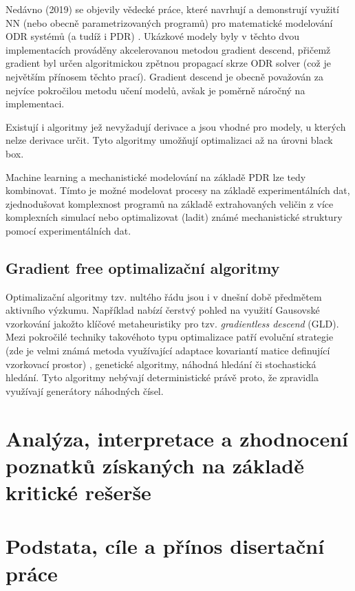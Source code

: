 Nedávno (2019) se objevily vědecké práce, které navrhují a demonstrují využití
NN (nebo obecně parametrizovaných programů) pro matematické modelování ODR
systémů (a tudíž i PDR) \cite{diffEqFlux2019, chen2018neural}. Ukázkové modely
byly v těchto dvou implementacích prováděny akcelerovanou metodou gradient
descend, přičemž gradient byl určen algoritmickou zpětnou propagací skrze ODR
solver (což je největším přínosem těchto prací). Gradient descend je obecně
považován za nejvíce pokročilou metodu učení modelů, avšak je poměrně náročný
na implementaci.

Existují i algoritmy jež nevyžadují derivace a jsou vhodné pro modely, u
kterých nelze derivace určit. Tyto algoritmy umožňují optimalizaci až na úrovni
black box.

Machine learning a mechanistické modelování na základě PDR lze tedy kombinovat.
Tímto je možné modelovat procesy na základě experimentálních dat, zjednodušovat
komplexnost programů na základě extrahovaných veličin z více komplexních
simulací nebo optimalizovat (ladit) známé mechanistické struktury pomocí
experimentálních dat.

\section{Gradient free optimalizační algoritmy}
\label{sec:opt_alg}
Optimalizační algoritmy tzv. nultého řádu jsou i v dnešní době předmětem
aktivního výzkumu. Například \cite{golovin2019gradientless} nabízí čerstvý
pohled na využití Gausovské vzorkování jakožto klíčové metaheuristiky pro
tzv. \textit{gradientless descend} (GLD). Mezi pokročilé techniky takovéhoto
typu optimalizace patří evoluční strategie (zde je velmi známá metoda
využívající adaptace kovariantí matice definující vzorkovací prostor)
, genetické algoritmy, náhodná hledání či stochastická hledání.
Tyto algoritmy nebývají deterministické právě proto, že zpravidla využívají
generátory náhodných čísel.

\chapter{Analýza, interpretace a zhodnocení poznatků získaných na základě
kritické rešerše}
\chapter{Podstata, cíle a přínos disertační práce}
\label{chap:Aims_of_disertation}
